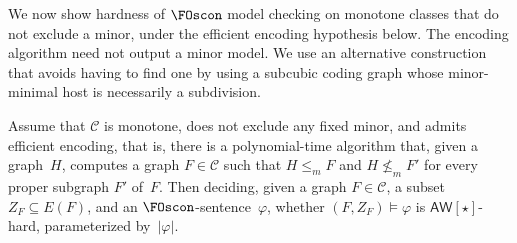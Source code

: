\documentclass[1p,number,11pt]{elsarticle}
\theoremstyle{plain}
\newcommand{\Cc}{\mathscr{C}}
\renewcommand{\leq}{\leqslant}
\begin{document}
We now show hardness of $\FOscon$ model checking on monotone classes that do not exclude a minor, under the efficient encoding hypothesis below.
The encoding algorithm need not output a minor model.
We use an alternative construction that avoids having to find one by using a subcubic coding graph whose minor-minimal host is necessarily a subdivision.

\begin{theorem}[store=thm:main-hardness-new,
    restate-keys={note=see \zcpageref[nocap]{thm:main-hardness-new}}]
Assume that $\Cc$ is monotone, does not exclude any fixed minor, and admits
efficient encoding, that is, there is a polynomial-time algorithm that, given
a graph~$H$, computes a graph $F\in\Cc$ such that $H\leq_m F$ and
$H\not\leq_m F'$ for every proper subgraph $F'$ of~$F$.
Then deciding, given a graph $F\in\Cc$, a subset $Z_F\subseteq E(F)$, and an
$\FOscon$-sentence~$\varphi$, whether $(F,Z_F)\models\varphi$ is
$\mathsf{AW}[\star]$-hard, parameterized by~$|\varphi|$.
\end{theorem}
\end{document}
